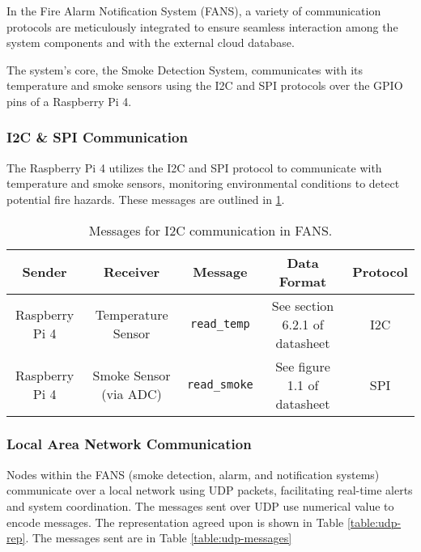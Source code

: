 In the Fire Alarm Notification System (FANS), a variety of communication protocols are meticulously integrated to
ensure seamless interaction among the system components and with the external cloud database.

The system’s core, the Smoke Detection System, communicates with its temperature and smoke sensors using the I2C and
SPI protocols over the GPIO pins of a Raspberry Pi 4.

\subsubsection{I2C \& SPI Communication}

The Raspberry Pi 4 utilizes the I2C and SPI protocol to communicate with temperature and smoke sensors, monitoring
environmental conditions to detect potential fire hazards. These messages are outlined in \ref{table:i2c}.

\begin{table}
    \centering
    \begin{tabular}{| c | c | c | c | c |}
        \hline
        Sender         & Receiver               & Message              & Data Format                                          & Protocol                 \\
        \hline
        Raspberry Pi 4 & Temperature Sensor     & \texttt{read\_temp}  & See section 6.2.1 of datasheet \cite{temp-datasheet} & I2C                      \\
        \hline
        Raspberry Pi 4 & Smoke Sensor (via ADC) & \texttt{read\_smoke} & See figure 1.1 of datasheet \cite{adc-datasheet}     & SPI \cite{adc-datasheet} \\
        \hline
    \end{tabular}
    \caption{Messages for I2C communication in FANS.}
    \label{table:i2c}
\end{table}

\subsubsection{Local Area Network Communication}

Nodes within the FANS (smoke detection, alarm, and notification systems) communicate over a local network using UDP
packets, facilitating real-time alerts and system coordination. The messages sent over UDP use numerical value to
encode messages. The representation agreed upon is shown in Table \ref{table:udp-rep}. The messages sent are in Table
\ref{table:udp-messages}

